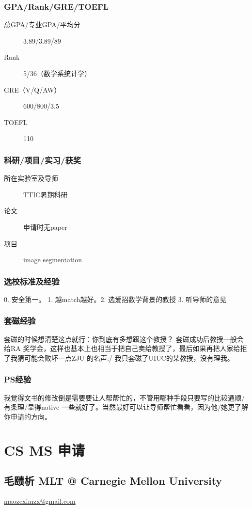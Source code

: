 \documentclass[11pt,fleqn,openany]{book} %
\begin{document}
\subsection*{GPA/Rank/GRE/TOEFL}
\begin{description}
\item[总GPA/专业GPA/平均分] 3.89/3.89/89
\item[Rank] 5/36（数学系统计学）
\item[GRE（V/Q/AW）] 600/800/3.5
\item[TOEFL] 110
\end{description}

\subsection*{科研/项目/实习/获奖}
\begin{description}
\item[所在实验室及导师] TTIC暑期科研
\item[论文] 申请时无paper
\item[项目] image segmentation
\end{description}
\subsection*{选校标准及经验}
0. 安全第一。 1. 越match越好。2. 选爱招数学背景的教授 3. 听导师的意见
\subsection*{套磁经验}
套磁的时候想清楚这点就行：你到底有多想跟这个教授？ 套磁成功后教授一般会给RA
奖学金，这样也基本上也相当于把自己卖给教授了，最后如果再把人家给拒了我猜可能会败坏一点ZJU 的名声:/
我只套磁了UIUC的某教授，没有理我。
\subsection*{PS经验}
我觉得文书的修改倒是需要要让人帮帮忙的，不管用哪种手段只要写的比较通顺/有条理/显得native
一些就好了。当然最好可以让导师帮忙看看，因为他/她更了解你申请的方向。
\clearpage
\cleardoublepage
\chapter{CS MS 申请}
\section{毛赜析 MLT @ Carnegie Mellon University}
\hfill \href{mailto:maozeximzx@gmail.com}{maozeximzx@gmail.com}
\end{document}
